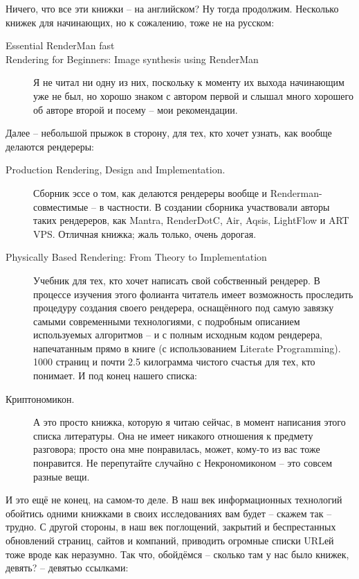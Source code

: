  Ничего, что все эти книжки – на английском? Ну тогда продолжим. Несколько книжек для начинающих, но к сожалению, тоже не на русском:

\begin{description}
	\item [Essential RenderMan fast]   
	\item [Rendering for Beginners: Image synthesis using RenderMan]   Я не читал ни одну из них, поскольку к моменту их
    выхода начинающим уже не был, но хорошо знаком с автором первой и
    слышал много хорошего об авторе второй и посему – мои
    рекомендации.

\end{description}
  
 Далее – небольшой прыжок в сторону, для тех, кто
    хочет узнать, как вообще делаются рендереры:

	\begin{description}
		\item [Production Rendering, Design and Implementation.] Сборник эссе
	      о том, как делаются рендереры вообще и Renderman-совместимые – в
	      частности. В создании сборника участвовали авторы таких рендереров,
	      как Mantra, RenderDotC, Air, Aqsis, LightFlow и ART VPS. Отличная
	      книжка; жаль только, очень дорогая.
	  
		\item [Physically Based Rendering: From Theory to Implementation]  Учебник для
	      тех, кто хочет написать свой собственный рендерер. В процессе
	      изучения этого фолианта читатель имеет возможность проследить
	      процедуру создания своего рендерера, оснащённого под самую завязку
	      самыми современными технологиями, с подробным описанием
	      используемых алгоритмов – и с полным исходным кодом рендерера,
	      напечатанным прямо в книге (с использованием Literate Programming).
	      1000 страниц и почти 2.5 килограмма чистого счастья для тех, кто
	      понимает.  И под конец нашего списка:
	
		\item [Криптономикон.] А это просто книжка, которую я читаю сейчас, в момент написания
	      этого списка литературы. Она не имеет никакого отношения к предмету
	      разговора; просто она мне понравилась, может, кому-то из вас тоже
	      понравится. Не перепутайте случайно с Некрономиконом – это совсем разные
	      вещи.
	
	\end{description}

  
 И это ещё не конец, на самом-то деле. В наш век
    информационных технологий обойтись одними книжками в своих
    исследованиях вам будет – скажем так – трудно. С другой стороны, в
    наш век поглощений, закрытий и беспрестанных обновлений страниц,
    сайтов и компаний, приводить огромные списки URLей тоже вроде как
    неразумно. Так что, обойдёмся – сколько там у нас было книжек,
    девять? – девятью ссылками:

